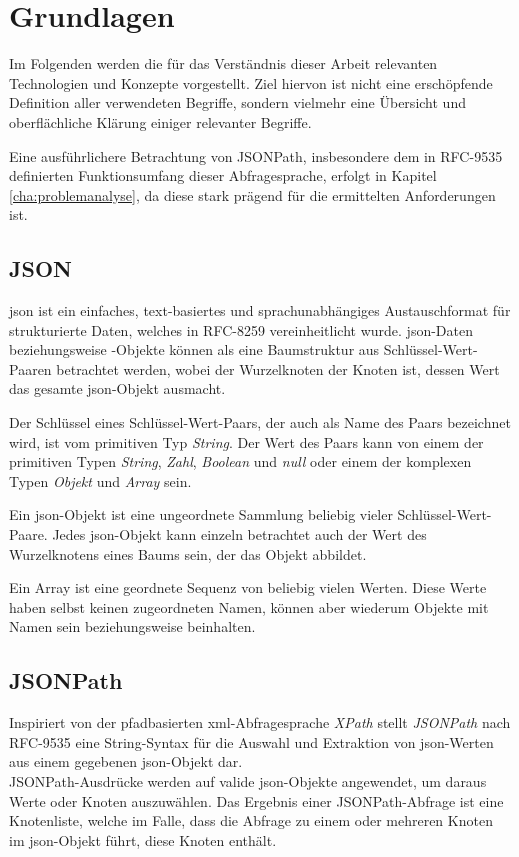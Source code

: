 \documentclass[oneside]{ausarbeitung}
\begin{document}
\chapter{Grundlagen}
\label{cha:grundlagen}

Im Folgenden werden die für das Verständnis dieser Arbeit relevanten Technologien und Konzepte vorgestellt. Ziel hiervon ist nicht eine erschöpfende Definition aller verwendeten Begriffe, sondern vielmehr eine Übersicht und oberflächliche Klärung einiger relevanter Begriffe.
	
Eine ausführlichere Betrachtung von JSONPath, insbesondere dem in RFC-9535 definierten Funktionsumfang dieser Abfragesprache, erfolgt in Kapitel \ref{cha:problemanalyse}, da diese stark prägend für die ermittelten Anforderungen ist.

\section{JSON}
	
\ac{json} ist ein einfaches, text-basiertes und sprachunabhängiges Austauschformat für strukturierte Daten, welches in RFC-8259 vereinheitlicht wurde. \ac{json}-Daten beziehungsweise -Objekte können als eine Baumstruktur aus Schlüssel-Wert-Paaren betrachtet werden, wobei der Wurzelknoten der Knoten ist, dessen Wert das gesamte \ac{json}-Objekt ausmacht. \cite{Bray:json}
	
Der Schlüssel eines Schlüssel-Wert-Paars, der auch als Name des Paars bezeichnet wird, ist vom primitiven Typ \textit{String}. Der Wert des Paars kann von einem der primitiven Typen \textit{String}, \textit{Zahl}, \textit{Boolean} und \textit{null} oder einem der komplexen Typen \textit{Objekt} und \textit{Array} sein.
	
Ein \ac{json}-Objekt ist eine ungeordnete Sammlung beliebig vieler Schlüssel-Wert-Paare. Jedes \ac{json}-Objekt kann einzeln betrachtet auch der Wert des Wurzelknotens eines Baums sein, der das Objekt abbildet. 
	
Ein Array ist eine geordnete Sequenz von beliebig vielen Werten. Diese Werte haben selbst keinen zugeordneten Namen, können aber wiederum Objekte mit Namen sein beziehungsweise beinhalten.  
	
\section{JSONPath}
	
Inspiriert von der pfadbasierten \ac{xml}-Abfragesprache \textit{XPath} stellt \textit{JSONPath} nach RFC-9535 eine String-Syntax für die Auswahl und Extraktion von \ac{json}-Werten aus einem gegebenen \ac{json}-Objekt dar. \\
JSONPath-Ausdrücke werden auf valide \ac{json}-Objekte angewendet, um daraus Werte oder Knoten auszuwählen. Das Ergebnis einer JSONPath-Abfrage ist eine Knotenliste, welche im Falle, dass die Abfrage zu einem oder mehreren Knoten im \ac{json}-Objekt führt, diese Knoten enthält.\cite{Gössner:jsonpath}
	
\end{document}
